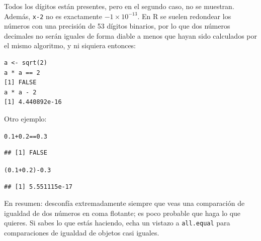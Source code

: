 \documentclass{config/apuntes}\usepackage[]{graphicx}\usepackage[]{xcolor}
\makeatletter
\newcommand{\hlnum}[1]{\textcolor[rgb]{0.686,0.059,0.569}{#1}}%
\newcommand{\hlopt}[1]{\textcolor[rgb]{0,0,0}{#1}}%
\newcommand{\hldef}[1]{\textcolor[rgb]{0.345,0.345,0.345}{#1}}%
\newenvironment{kframe}{%
 \def\at@end@of@kframe{}%
 \ifinner\ifhmode%
  \def\at@end@of@kframe{\end{minipage}}%
  \begin{minipage}{\columnwidth}%
 \fi\fi%
 \def\FrameCommand##1{\hskip\@totalleftmargin \hskip-\fboxsep
 \colorbox{shadecolor}{##1}\hskip-\fboxsep
     \hskip-\linewidth \hskip-\@totalleftmargin \hskip\columnwidth}%
 \MakeFramed {\advance\hsize-\width
   \@totalleftmargin\z@ \linewidth\hsize
   \@setminipage}}%
 {\par\unskip\endMakeFramed%
 \at@end@of@kframe}
\newenvironment{knitrout}{}{} %
\newcommand{\code}[1]{\texttt{#1}}
\makeatother
\begin{document}
Todos los dígitos están presentes, pero en el segundo caso, no se muestran. Además, \code{x-2} no es exactamente $-1 \times 10^{-13}$. En R se suelen redondear los números con una precisión de 53 dígitos binarios, por lo que dos números decimales no serán iguales de forma diable a menos que hayan sido calculados por el mismo algoritmo, y ni siquiera entonces: 
\begin{verbatim}
a <- sqrt(2)
a * a == 2
[1] FALSE
a * a - 2
[1] 4.440892e-16
\end{verbatim}

Otro ejemplo:
\begin{knitrout}
\color{fgcolor}\begin{kframe}
\begin{alltt}
\hlnum{0.1} \hlopt{+} \hlnum{0.2} \hlopt{==} \hlnum{0.3}
\end{alltt}
\begin{verbatim}
## [1] FALSE
\end{verbatim}
\begin{alltt}
\hldef{(}\hlnum{0.1} \hlopt{+} \hlnum{0.2}\hldef{)} \hlopt{-} \hlnum{0.3}
\end{alltt}
\begin{verbatim}
## [1] 5.551115e-17
\end{verbatim}
\end{kframe}
\end{knitrout}

En resumen: desconfía extremadamente siempre que veas una comparación de igualdad de dos números en coma flotante; es poco probable que haga lo que quieres. Si sabes lo que estás haciendo, echa un vistazo a \code{all.equal} para comparaciones de igualdad de objetos casi iguales.
\end{document}
